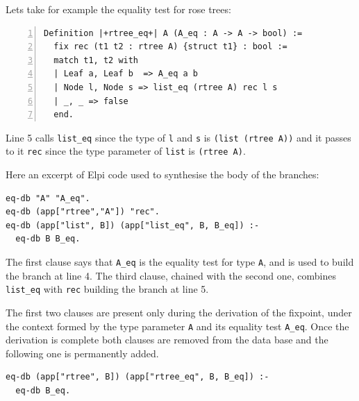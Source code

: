 \documentclass[sigplan,10pt,review]{acmart}\settopmatter{printfolios=true,printccs=false,printacmref=false}
\begin{document}
Lets take for example the equality test for rose trees:

\begin{minipage}{\textwidth}\begin{lstlisting}[numbers=left]
Definition |+rtree_eq+| A (A_eq : A -> A -> bool) :=
  fix rec (t1 t2 : rtree A) {struct t1} : bool :=
  match t1, t2 with
  | Leaf a, Leaf b  => A_eq a b
  | Node l, Node s => list_eq (rtree A) rec l s
  | _, _ => false
  end.
\end{lstlisting}\end{minipage}

\noindent
Line 5 calls \lstinline+list_eq+ since the type of \lstinline+l+ and
\lstinline+s+ is \lstinline+(list (rtree A))+ and it passes to it
\lstinline+rec+ since the type parameter of \lstinline+list+ is
\lstinline+(rtree A)+.

Here an excerpt of Elpi code used to synthesise the body of the
branches:

\begin{minipage}{\textwidth}\begin{lstlisting}
eq-db "A" "A_eq".
eq-db (app["rtree","A"]) "rec".
eq-db (app["list", B]) (app["list_eq", B, B_eq]) :-
  eq-db B B_eq.
\end{lstlisting}\end{minipage}

\noindent
The first clause says that \lstinline+A_eq+ is the equality test for type
\lstinline+A+, and is used to build the branch at line 4.
The third clause, chained with the second one, combines
\lstinline+list_eq+ with \lstinline+rec+ building the branch at line
5.

The first two clauses are present only during the
derivation of the fixpoint, under the context formed by
the type parameter \lstinline+A+ and its equality test
\lstinline+A_eq+. 
Once the derivation is complete both clauses are removed 
from the data base and the
following one is permanently added.

\begin{minipage}{\textwidth}\begin{lstlisting}[]
eq-db (app["rtree", B]) (app["rtree_eq", B, B_eq]) :-
  eq-db B_eq.
\end{lstlisting}\end{minipage}


% 
% 
\end{document}
